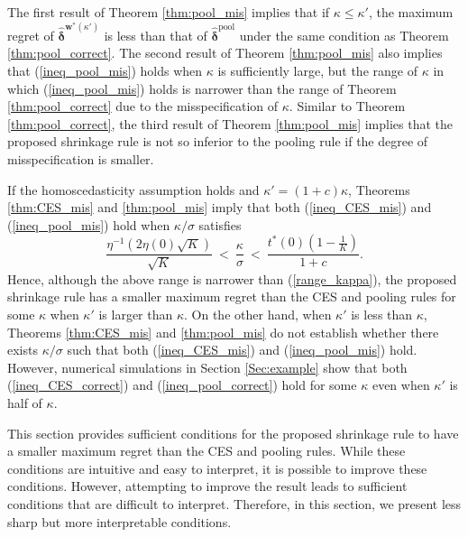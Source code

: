 \documentclass[12pt,a4paper]{article}
\begin{document}
The first result of Theorem \ref{thm:pool_mis} implies that if $\kappa \leq \kappa'$, the maximum regret of $\hat{\bm{\delta}}^{\bm{w}^{\ast}(\kappa')}$ is less than that of $\hat{\bm{\delta}}^{\mathrm{pool}}$ under the same condition as Theorem \ref{thm:pool_correct}. The second result of Theorem \ref{thm:pool_mis} also implies that (\ref{ineq_pool_mis}) holds when $\kappa$ is sufficiently large, but the range of $\kappa$ in which (\ref{ineq_pool_mis}) holds is narrower than the range of Theorem \ref{thm:pool_correct} due to the misspecification of $\kappa$. Similar to Theorem \ref{thm:pool_correct}, the third result of Theorem \ref{thm:pool_mis} implies that the proposed shrinkage rule is not so inferior to the pooling rule if the degree of misspecification is smaller.

If the homoscedasticity assumption holds and $\kappa' = (1+c) \kappa$, Theorems \ref{thm:CES_mis} and \ref{thm:pool_mis} imply that both (\ref{ineq_CES_mis}) and (\ref{ineq_pool_mis}) hold when $\kappa / \sigma$ satisfies
\[
\frac{\eta^{-1} \left( 2 \eta(0) \sqrt{K} \right)}{\sqrt{K}} \ < \ \frac{\kappa}{\sigma} \ < \ \frac{t^{\ast}(0) \left( 1 - \frac{1}{K}  \right)}{1+c}.
\]
Hence, although the above range is narrower than (\ref{range_kappa}), the proposed shrinkage rule has a smaller maximum regret than the CES and pooling rules for some $\kappa$ when $\kappa'$ is larger than $\kappa$. On the other hand, when $\kappa'$ is less than $\kappa$, Theorems \ref{thm:CES_mis} and \ref{thm:pool_mis} do not establish whether there exists $\kappa / \sigma$ such that both (\ref{ineq_CES_mis}) and (\ref{ineq_pool_mis}) hold. However, numerical simulations in Section \ref{Sec:example} show that both (\ref{ineq_CES_correct}) and (\ref{ineq_pool_correct}) hold for some $\kappa$ even when $\kappa'$ is half of $\kappa$.

This section provides sufficient conditions for the proposed shrinkage rule to have a smaller maximum regret than the CES and pooling rules. While these conditions are intuitive and easy to interpret, it is possible to improve these conditions. However, attempting to improve the result leads to sufficient conditions that are difficult to interpret. Therefore, in this section, we present less sharp but more interpretable conditions.
\end{document}
